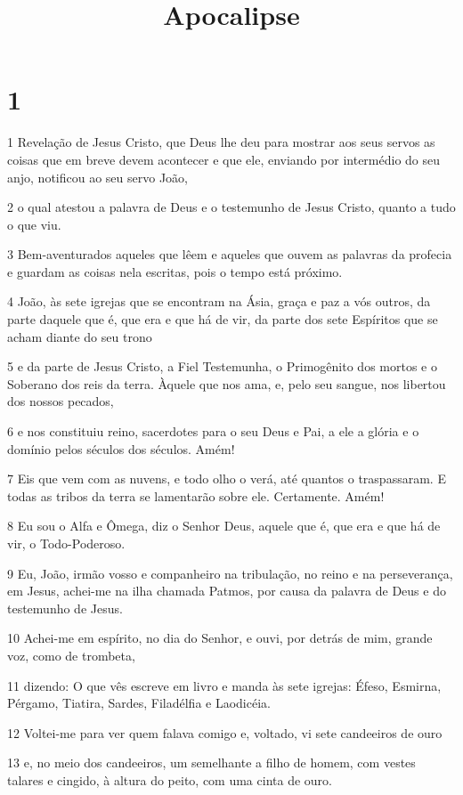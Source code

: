 

\title{Apocalipse}


\chapter{1}

\par 1 Revelação de Jesus Cristo, que Deus lhe deu para mostrar aos seus servos as coisas que em breve devem acontecer e que ele, enviando por intermédio do seu anjo, notificou ao seu servo João,
\par 2 o qual atestou a palavra de Deus e o testemunho de Jesus Cristo, quanto a tudo o que viu.
\par 3 Bem-aventurados aqueles que lêem e aqueles que ouvem as palavras da profecia e guardam as coisas nela escritas, pois o tempo está próximo.
\par 4 João, às sete igrejas que se encontram na Ásia, graça e paz a vós outros, da parte daquele que é, que era e que há de vir, da parte dos sete Espíritos que se acham diante do seu trono
\par 5 e da parte de Jesus Cristo, a Fiel Testemunha, o Primogênito dos mortos e o Soberano dos reis da terra. Àquele que nos ama, e, pelo seu sangue, nos libertou dos nossos pecados,
\par 6 e nos constituiu reino, sacerdotes para o seu Deus e Pai, a ele a glória e o domínio pelos séculos dos séculos. Amém!
\par 7 Eis que vem com as nuvens, e todo olho o verá, até quantos o traspassaram. E todas as tribos da terra se lamentarão sobre ele. Certamente. Amém!
\par 8 Eu sou o Alfa e Ômega, diz o Senhor Deus, aquele que é, que era e que há de vir, o Todo-Poderoso.
\par 9 Eu, João, irmão vosso e companheiro na tribulação, no reino e na perseverança, em Jesus, achei-me na ilha chamada Patmos, por causa da palavra de Deus e do testemunho de Jesus.
\par 10 Achei-me em espírito, no dia do Senhor, e ouvi, por detrás de mim, grande voz, como de trombeta,
\par 11 dizendo: O que vês escreve em livro e manda às sete igrejas: Éfeso, Esmirna, Pérgamo, Tiatira, Sardes, Filadélfia e Laodicéia.
\par 12 Voltei-me para ver quem falava comigo e, voltado, vi sete candeeiros de ouro
\par 13 e, no meio dos candeeiros, um semelhante a filho de homem, com vestes talares e cingido, à altura do peito, com uma cinta de ouro.
